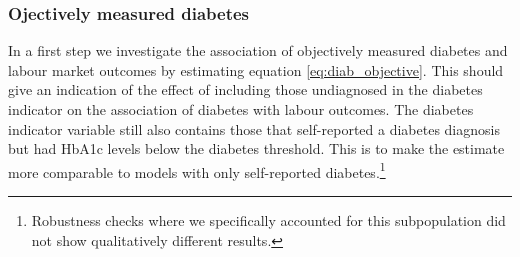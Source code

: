 \subsubsection*{Ojectively measured diabetes}
In a first step we investigate the association of objectively measured diabetes and labour market outcomes by estimating equation \ref{eq:diab_objective}. This should give an indication of the effect of including those undiagnosed in the diabetes indicator on the association of diabetes with labour outcomes. The diabetes indicator variable still also contains those that self-reported a diabetes diagnosis but had \ac{HbA1c} levels below the diabetes threshold. This is to make the estimate more comparable to models with only self-reported diabetes.\footnote{Robustness checks where we specifically accounted for this subpopulation did not show qualitatively different results.}

